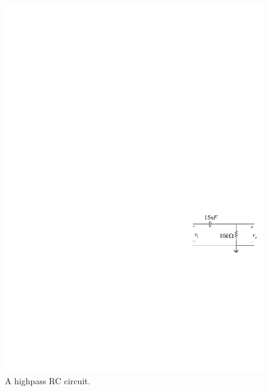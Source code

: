 \documentclass[11pt]{article}
\begin{document}

\begin{question}


    \begin{figure}[H]
        \centering
        \includegraphics[scale=1.2,angle=0]{Fig/cir3.pdf}
        \caption{A highpass RC circuit.} \label{fig:cir3}
    \end{figure}


\end{question}
\end{document}
